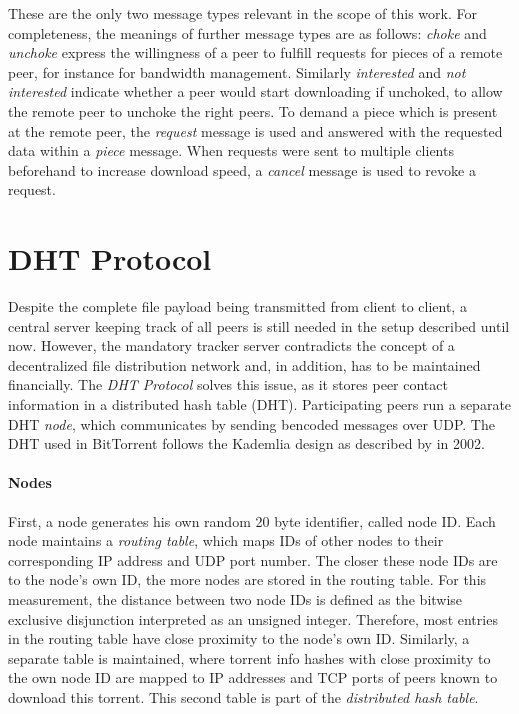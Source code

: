 \documentclass[10pt, a4paper, twoside, headsepline]{scrbook}
\renewcommand{\_}{\origunderscore\allowbreak}
\begin{document}
These are the only two message types relevant in the scope of this work. For completeness, the meanings of further message types are as follows: \emph{choke} and \emph{unchoke} express the willingness of a peer to fulfill requests for pieces of a remote peer, for instance for bandwidth management. Similarly \emph{interested} and \emph{not interested} indicate whether a peer would start downloading if unchoked, to allow the remote peer to unchoke the right peers. To demand a piece which is present at the remote peer, the \emph{request} message is used and answered with the requested data within a \emph{piece} message. When requests were sent to multiple clients beforehand to increase download speed, a \emph{cancel} message is used to revoke a request.

\section{DHT Protocol}
\label{dht}
Despite the complete file payload being transmitted from client to client, a central server keeping track of all peers is still needed in the setup described until now. However, the mandatory tracker server contradicts the concept of a decentralized file distribution network and, in addition, has to be maintained financially. The \emph{DHT Protocol} \cite{bep5} solves this issue, as it stores peer contact information in a distributed hash table (DHT). Participating peers run a separate DHT \emph{node}, which communicates by sending bencoded messages over UDP. The DHT used in BitTorrent follows the Kademlia design as described by \textcite{kademlia} in 2002.

\paragraph{Nodes}
First, a node generates his own random 20 byte identifier, called node ID. Each node maintains a \emph{routing table}, which maps IDs of other nodes to their corresponding IP address and UDP port number. The closer these node IDs are to the node's own ID, the more nodes are stored in the routing table. For this measurement, the distance between two node IDs is defined as the bitwise exclusive disjunction interpreted as an unsigned integer. Therefore, most entries in the routing table have close proximity to the node's own ID. Similarly, a separate table is maintained, where torrent info hashes with close proximity to the own node ID are mapped to IP addresses and TCP ports of peers known to download this torrent. This second table is part of the \emph{distributed hash table}.
\end{document}
